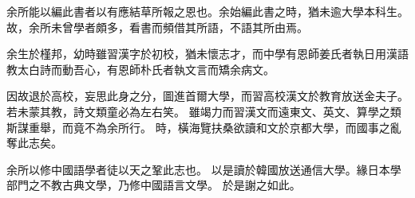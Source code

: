 余所能以編此書者以有應結草所報之恩也。余始編此書之時，猶未逾大學本科生。故，余所未曾學者頗多，看書而頻借其所語，不語其所由焉。

余生於槿邦，幼時雖習漢字於初校，猶未懷志才，而中學有恩師姜氏者執日用漢語教太白詩而動吾心，有恩師朴氏者執文言而矯余病文。

因故退於高校，妄思此身之分，圖進首爾大學，而習高校漢文於教育放送金夫子。若未蒙其教，詩文類童必為左右笑。
雖竭力而習漢文而遠東文、英文、算學之類斯謀重舉，而竟不為余所行。
時，橫海覽扶桑欲讀和文於京都大學，而國事之亂奪此志矣。

余所以修中國語學者徒以天之鞏此志也。
以是讀於韓國放送通信大學。緣日本學部門之不教古典文學，乃修中國語言文學。
於是謝之如此。